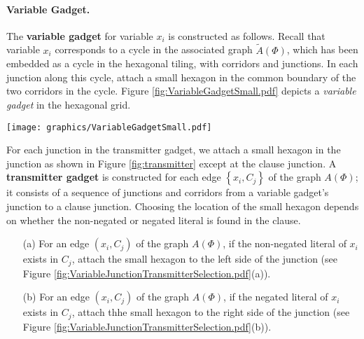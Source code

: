 \documentclass[10pt]{CSUNthesis}
\theoremstyle{plain}%
\theoremstyle{definition}
\theoremstyle{remark}
\begin{document}

\paragraph{Variable Gadget.}
The {\bf variable gadget} for variable $x_i$ is constructed as follows. 
Recall that variable $x_i$ corresponds to a cycle in the associated graph $\tilde{A}(\Phi)$, which has been embedded as a cycle in the hexagonal tiling, with corridors and junctions. 
In each junction along this cycle, attach a small hexagon in the common boundary of the two corridors in the cycle. 
Figure \ref{fig:VariableGadgetSmall.pdf} depicts a \textit{variable gadget} in the hexagonal grid.

\begin{minipage}{\linewidth}
\begin{center}
\texttt{[image: graphics/VariableGadgetSmall.pdf]}
\label{fig:VariableGadgetSmall.pdf}
\end{center}
\end{minipage}

For each junction in the transmitter gadget, we attach a small hexagon in the junction as shown in Figure \ref{fig:transmitter} except at the clause junction.
 A {\bf transmitter gadget} is constructed for each edge $\left\lbrace x_i,C_j\right\rbrace$ of the graph $A(\Phi)$; it consists of a sequence of junctions and corridors from a variable gadget's junction to a clause junction.  
Choosing the location of the small hexagon depends on whether the non-negated or negated literal is found in the clause.
\begin{itemize}
\item[(a)]  For an edge $(x_i,C_j)$ of the graph $A(\Phi)$, if the non-negated literal of $x_i$ exists in $C_j$, attach the small hexagon to the left side of the junction (see Figure \ref{fig:VariableJunctionTransmitterSelection.pdf}(a)).
\item[(b)]  For an edge $(x_i,C_j)$ of the graph $A(\Phi)$, if the negated literal of $x_i$ exists in $C_j$, attach thhe small hexagon to the right side of the junction (see Figure \ref{fig:VariableJunctionTransmitterSelection.pdf}(b)).
\end{itemize}
\end{document}
